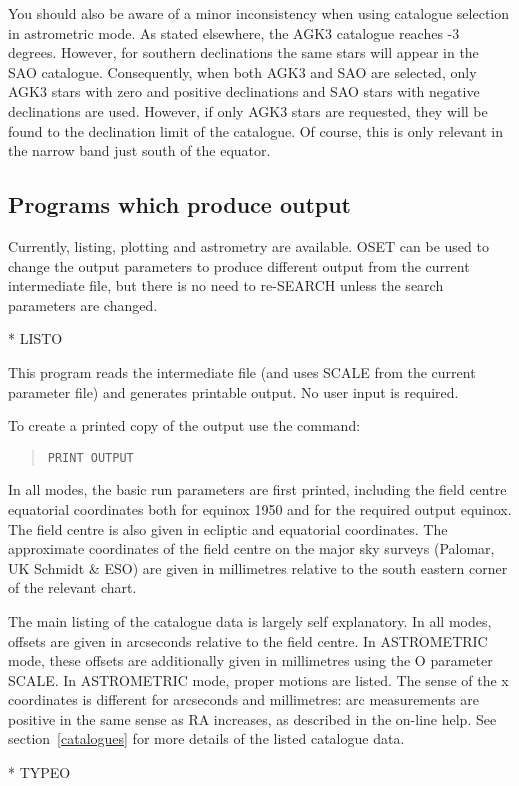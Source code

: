 You should also be aware of a minor inconsistency when using catalogue selection
in astrometric mode.
As stated elsewhere, the AGK3 catalogue reaches -3 degrees.
However, for southern declinations the same stars will appear in the SAO
catalogue.
Consequently, when both AGK3 and SAO are selected, only AGK3 stars with zero and
positive declinations and SAO stars with negative declinations are used.
However, if only AGK3 stars are requested, they will be found to the declination
limit of the catalogue.
Of course, this is only relevant in the narrow band just south of the equator.
\subsection{Programs which produce output}
\label{output}
Currently, listing, plotting and astrometry are available.
OSET can be used to change the output parameters to produce different output
from the current intermediate file, but there is no need to re-SEARCH unless the
search parameters are changed.

* LISTO

This program reads the intermediate file (and uses SCALE from the current
parameter file) and generates printable output.
No user input is required.

To create a printed copy of the output use the command:
\begin{quote}
{\tt PRINT OUTPUT}
\end{quote}
In all modes, the basic run parameters are first printed, including the field
centre equatorial coordinates both for equinox 1950 and for the required output
equinox.
The field centre is also given in ecliptic and equatorial coordinates.
The approximate coordinates of the field centre on the major sky surveys
(Palomar, UK Schmidt \& ESO) are given in millimetres relative to the south
eastern corner of the relevant chart.

The main listing of the catalogue data is largely self explanatory.
In all modes, offsets are given in arcseconds relative to the field centre.
In ASTROMETRIC mode, these offsets are additionally given in millimetres using
the O parameter SCALE.
In ASTROMETRIC mode, proper motions are listed.
The sense of the x coordinates is different for arcseconds and millimetres:
arc measurements are positive in the same sense as RA increases, as described in
the on-line help.
See section~\ref{catalogues} for more details of the listed catalogue data.

* TYPEO

